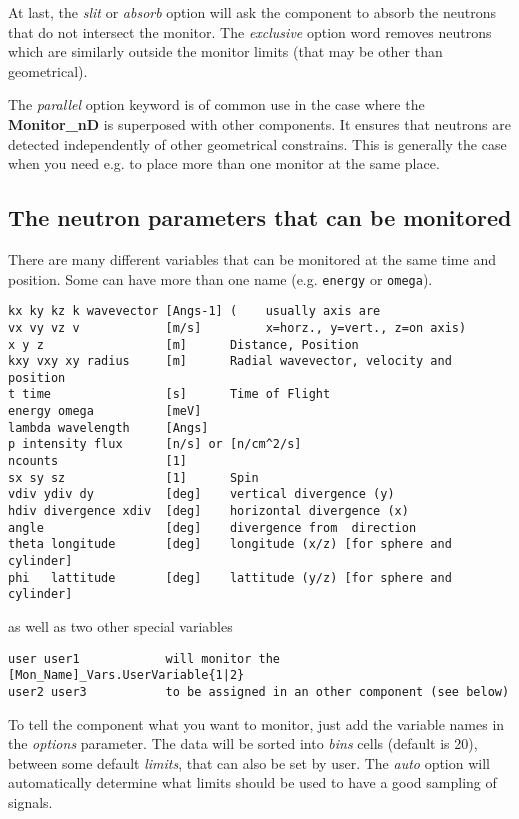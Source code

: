 At last, the \textit{slit} or \textit{absorb} option will ask the component to
absorb the neutrons that do not intersect the monitor. The \textit{exclusive} option word removes neutrons which are similarly outside the monitor limits (that may be other than geometrical).

The \textit{parallel} option keyword is of common use in the case where the \textbf{Monitor\_nD} is superposed with other components. It ensures that neutrons are detected independently of other geometrical constrains. This is generally the case when you need e.g. to place more than one monitor at the same place.

\subsection{The neutron parameters that can be monitored}

There are many different variables that can be monitored at the same time
and position. Some can have more than one name (e.g. \texttt{energy} or
\texttt{omega}).


\begin{lstlisting}
kx ky kz k wavevector [Angs-1] (    usually axis are
vx vy vz v            [m/s]         x=horz., y=vert., z=on axis)
x y z                 [m]      Distance, Position
kxy vxy xy radius     [m]      Radial wavevector, velocity and position
t time                [s]      Time of Flight
energy omega          [meV]
lambda wavelength     [Angs]
p intensity flux      [n/s] or [n/cm^2/s]
ncounts               [1]
sx sy sz              [1]      Spin
vdiv ydiv dy          [deg]    vertical divergence (y)
hdiv divergence xdiv  [deg]    horizontal divergence (x)
angle                 [deg]    divergence from  direction
theta longitude       [deg]    longitude (x/z) [for sphere and cylinder]
phi   lattitude       [deg]    lattitude (y/z) [for sphere and cylinder]
\end{lstlisting}
as well as two other special variables
\begin{lstlisting}
user user1            will monitor the [Mon_Name]_Vars.UserVariable{1|2}
user2 user3           to be assigned in an other component (see below)
\end{lstlisting}

To tell the component what you want to monitor, just add the variable
names in the \textit{options} parameter. The data will be sorted into \textit{
  bins} cells (default is 20), between some default \textit{limits}, that
can also be set by user. The \textit{auto} option will automatically
determine what limits should be used to have a good sampling of signals.

